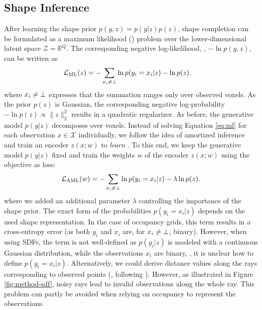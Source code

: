 \subsection{Shape Inference}
\label{subsec:method-inference}

After learning the shape prior $p(y, z) = p(y| z) p(z)$, shape completion can be formulated as a maximum likelihood (\ML) problem over the lower-dimensional latent space $\mathcal{Z} = \mathbb{R}^Q$. The corresponding negative log-likelihood, \ie, $-\ln p(y, z)$, can be written as
%
\begin{align}
\mathcal{L}_{\text{ML}}(z) &= - \sum_{x_i \neq \bot} \ln p(y_i = x_i | z) - \ln p(z).\label{eq:ml}
\end{align}
%
where $x_i \neq \bot$ expresses that the summation ranges only over observed voxels.
As the prior $p(z)$ is Gaussian, the corresponding negative log-probability $- \ln p(z) \propto \|z\|_2^2$ results in a quadratic regularizer. As before, the generative model $p(y | z)$ decomposes over voxels.
Instead of solving Equation \eqref{eq:ml} for each observation $x \in \mathcal{X}$ individually, we follow the idea of amortized inference \cite{Gersham2014COGSCI} and train an encoder $z(x;w)$ to \emph{learn} \ML. To this end, we keep the generative model $p(y|z)$ fixed and train the weights $w$ of the encoder $z(x;w)$ using the \ML objective as loss:
%
\begin{align}
\mathcal{L}_{\text{AML}}(w) = - \sum _{x_i \neq \bot} \ln p(y_i = x_i | z) - \lambda \ln p(z).\label{eq:aml}
\end{align}
%
where we added an additional parameter $\lambda$ controlling the importance of the shape prior. The exact form of the probabilities $p(y_i = x_i | z)$ depends on the used shape representation. In the case of occupancy grids, this term results in a cross-entropy error (as both $y_i$ and $x_i$ are, for $x_i \neq \bot$, binary). However, when using SDFs, the term is not well-defined as $p(y_i | z)$ is modeled with a continuous Gaussian distribution, while the observations $x_i$ are binary, \ie, it is unclear how to define $p(y_i = x_i | z)$. Alternatively, we could derive distance values along the rays corresponding to observed points (\eg, following \cite{Steinbrucker2013ICCV}). However, as illustrated in Figure \ref{fig:method-sdf}, noisy rays lead to invalid observations along the whole ray. This problem can partly be avoided when relying on occupancy to represent the observations.

